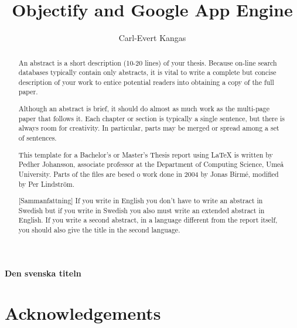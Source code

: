 \documentclass[a4paper,11pt,twoside]{report}
\title{Objectify and Google App Engine}
\subtitle{}
\author{Carl-Evert Kangas}
\begin{document}
\maketitle

\cleardoublepage


\begin{abstract}
An abstract is a short description (10-20 lines) of your thesis. Because on-line
search databases typically contain only abstracts, it is vital to write a
complete but concise description of your work to entice potential readers into
obtaining a copy of the full paper.

Although an abstract is brief, it should do almost as much work as the multi-page 
paper that follows it. Each chapter or section is typically a single sentence, 
but there is always room for creativity. In particular, parts may be merged or 
spread among a set of sentences.

This template for a Bachelor's or Master's Thesis report using {{\LaTeX}} is
written by Pedher Johansson, associate professor at the Department of Computing
Science, Umeå University. Parts of the files are besed o work done in 2004 by
Jonas Birmé, modified by Per Lindström.

\end{abstract}

\baselineskip

\begin{center}
  {\Large\bfseries Den svenska titeln}
\end{center}

\begin{abstract}[Sammanfattning]
If you write in English you don't have to write an abstract in Swedish but if
you write in Swedish you also must write an extended abstract in English. If you
write a second abstract, in a language different from the report itself, you
should also give the title in the second language.
\end{abstract}

\cleardoublepage

\chapter*{Acknowledgements}
\end{document}
